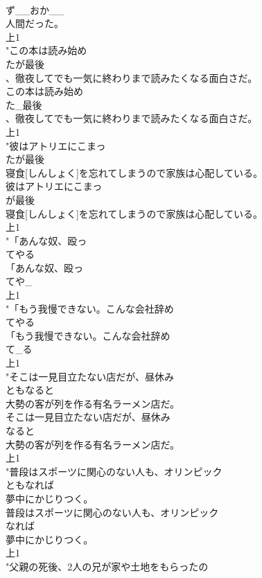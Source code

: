 \documentclass[8pt]{extreport}
\begin{document}
\begin{CJK}{UTF8}{min}
\\	ず__おか__
\\	人間だった。
\\	上1
\\	"この本は読み始め
\\	たが最後
\\	、徹夜してでも一気に終わりまで読みたくなる面白さだ。
\\	この本は読み始め
\\	た_最後
\\	、徹夜してでも一気に終わりまで読みたくなる面白さだ。
\\	上1
\\	"彼はアトリエにこまっ
\\	たが最後
\\	寝食[しんしょく]を忘れてしまうので家族は心配している。
\\	彼はアトリエにこまっ
\\	が最後
\\	寝食[しんしょく]を忘れてしまうので家族は心配している。
\\	上1
\\	"「あんな奴、殴っ
\\	てやる
\\	「あんな奴、殴っ
\\	てや_
\\	上1
\\	"「もう我慢できない。こんな会社辞め
\\	てやる
\\	「もう我慢できない。こんな会社辞め
\\	て_る
\\	上1
\\	"そこは一見目立たない店だが、昼休み
\\	ともなると
\\	大勢の客が列を作る有名ラーメン店だ。
\\	そこは一見目立たない店だが、昼休み
\\	なると
\\	大勢の客が列を作る有名ラーメン店だ。
\\	上1
\\	"普段はスポーツに関心のない人も、オリンピック
\\	ともなれば
\\	夢中にかじりつく。
\\	普段はスポーツに関心のない人も、オリンピック
\\	なれば
\\	夢中にかじりつく。
\\	上1
\\	"父親の死後、2人の兄が家や土地をもらったの

\end{CJK}
\end{document}
